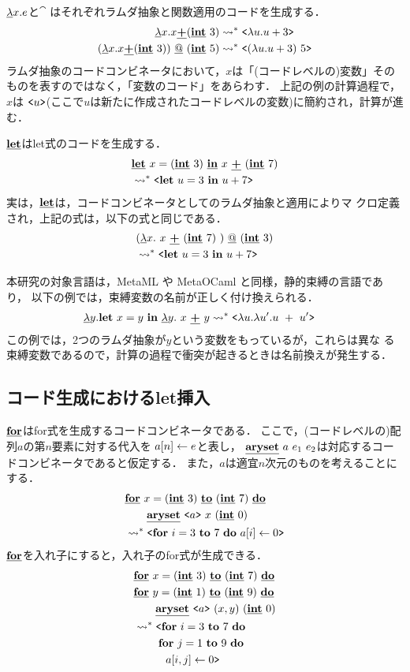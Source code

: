 $\cfun{x}{e}$と$\cat$ はそれぞれラムダ抽象と関数適用のコードを生成する．
\begin{align*}
\cfun{x}{x \cPlus (\cint~3)}   & \too \code{\fun{u}{u+3}} \\
(\cfun{x}{x \cPlus (\cint~3)}) \cat (\cint~5) & \too
\code{(\fun{u}{u+3})~5}
\end{align*}
ラムダ抽象のコードコンビネータにおいて，$x$は「(コードレベルの)変数」その
ものを表すのではなく，「変数のコード」をあらわす．
上記の例の計算過程で，$x$は
$\code{u}$(ここで$u$は新たに作成されたコードレベルの変数)に簡約され，計算が進む．

$\cLet$はlet式のコードを生成する．
\begin{align*}
& \clet{x}{(\cint~3)}{x~ \cPlus~ (\cint~7)} \\
  & \too \code{\Let~ u = 3~ \In~ u + 7}
\end{align*}
実は，$\cLet$は，コードコンビネータとしてのラムダ抽象と適用によりマ
クロ定義され，上記の式は，以下の式と同じである．
\begin{align*}
& (\cfun{x}{~x~ \cPlus~ (\cint~7)~}) \cat (\cint~3)  \\
& \too \code{\Let~ u = 3~ \In~ u + 7}
\end{align*}

本研究の対象言語は，MetaML や MetaOCaml と同様，静的束縛の言語であり，
以下の例では，束縛変数の名前が正しく付け換えられる．
\begin{align*}
\cfun{y}{\Let~ x = y~ \In~ \cfun{y}{~x~ \cPlus~ y}{}}{}
& \too \code{\fun{u}{\fun{u'}{u~ +~ u'}}}
\end{align*}
この例では，2つのラムダ抽象が$y$という変数をもっているが，これらは異な
る束縛変数であるので，計算の過程で衝突が起きるときは名前換えが発生する．

\subsection{コード生成におけるlet挿入}

$\cFor$はfor式を生成するコードコンビネータである．
ここで，(コードレベルの)配列$a$の第$n$要素に対する代入を
$\aryset{a}{n}{e}$と表し，
$\caryset{a}{e_1}{e_2}$は対応するコードコンビネータであると仮定する．
また，$a$は適宜$n$次元のものを考えることにする．
\begin{align*}
& \cforin{x=(\cint~3)}{(\cint~7)} \\
& \qquad \caryset{\code{a}}{x}{(\cint~0)} \\
& \too \code{\forin{i=3}{7}~\aryset{a}{i}{0}}
\end{align*}
$\cFor$を入れ子にすると，入れ子のfor式が生成できる．
\begin{align*}
& \cforin{x=(\cint~3)}{(\cint~7)} \\
& \cforin{y=(\cint~1)}{(\cint~9)} \\
& \qquad \caryset{\code{a}}{(x,y)}{(\cint~0)} \\
& \too \codebegin \forin{i=3}{7} \\
& \phantom{\too \codebegin} \forin{j=1}{9} \\
& \phantom{\too \codebegin} ~~\aryset{a}{i,j}{0} \codeend
\end{align*}

